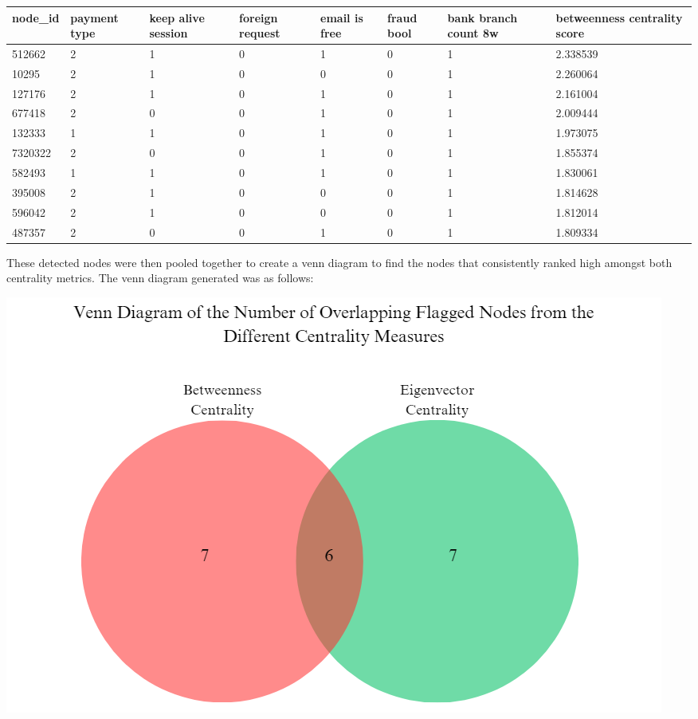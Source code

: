\documentclass{styles/svproc}
\begin{document}
\noindent
\begin{tabular}{ | m{2cm} | m{1.5cm}| m{1.2cm}| m{1.2cm}| m{1.2cm}| m{1.1cm}| m{1.2cm}| m{2.1cm}|} 
  \hline
  \textbf{node\_id} & \textbf{payment type} & \textbf{keep alive session} & \textbf{foreign request} &  \textbf{email is free} & \textbf{fraud bool} & \textbf{bank branch count 8w} & \textbf{betweenness centrality score}\\ 
  \hline
   512662 & 2 & 1 & 0 & 1 & 0 & 1 & 2.338539\\ 
  \hline
  10295 & 2 & 1 & 0 & 0 & 0 & 1 & 2.260064\\ 
  \hline
  127176 & 2 & 1 & 0 & 1 & 0 & 1 & 2.161004\\
  \hline
  677418 & 2 & 0 & 0 & 1 & 0 & 1 & 2.009444\\
  \hline
  132333 & 1 & 1 & 0 & 1 & 0 & 1 & 1.973075\\
  \hline
  7320322 & 2 & 0 & 0 & 1 & 0 & 1 & 1.855374\\
  \hline
  582493 & 1 & 1 & 0 & 1 & 0 & 1 & 1.830061\\
  \hline
  395008 & 2 & 1 & 0 & 0 & 0 & 1 & 1.814628\\
  \hline
  596042 & 2 & 1 & 0 & 0 & 0 & 1 & 1.812014\\
  \hline
  487357 & 2 & 0 & 0 & 1 & 0 & 1 & 1.809334\\
  \hline
\end{tabular}


\noindent These detected nodes were then pooled together to create a venn diagram to find the nodes that consistently ranked high amongst both centrality metrics. The venn diagram generated was as follows:

\includegraphics[scale=0.39]{venn}
\end{document}
